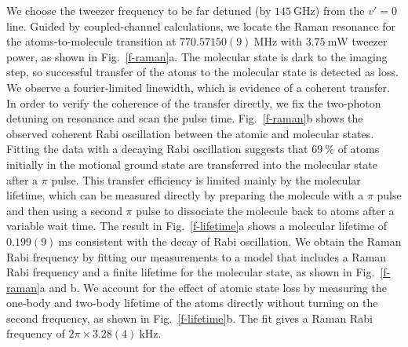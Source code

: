 \documentclass[aps,prl,twocolumn,10pt,superscriptaddress]{revtex4-1}
\begin{document}

We choose the tweezer frequency to be far detuned (by $145 ~\mathrm{GHz}$)
from the $v' = 0$ line. Guided by coupled-channel calculations,
we locate the Raman resonance for the atoms-to-molecule transition at
$770.57150(9) ~\mathrm{MHz}$ with $3.75~\mathrm{mW}$ tweezer power,
as shown in Fig.~\ref{f-raman}a.
The molecular state is dark to the imaging step,
so successful transfer of the atoms to the molecular state is detected as loss.
We observe a fourier-limited linewidth, which is evidence of a coherent transfer.
In order to verify the coherence of the transfer directly,
we fix the two-photon detuning on resonance and scan the pulse time.
Fig.~\ref{f-raman}b shows the observed coherent Rabi oscillation between the atomic and molecular states.
Fitting the data with a decaying Rabi oscillation suggests that
$69~\mathrm{\%}$ of atoms initially in the motional ground state are transferred into the molecular state after a $\pi$ pulse.
This transfer efficiency is limited mainly by the molecular lifetime,
which can be measured directly by preparing the molecule with a $\pi $ pulse
and then using a second $\pi$ pulse to dissociate the molecule back to atoms
after a variable wait time.
The result in Fig.~\ref{f-lifetime}a shows a molecular lifetime of $0.199(9)~\mathrm{ms}$
consistent with the decay of Rabi oscillation.
We obtain the Raman Rabi frequency by fitting our measurements to a model
that includes a Raman Rabi frequency and
a finite lifetime for the molecular state, as shown in Fig.~\ref{f-raman}a and b.
We account for the effect of atomic state loss by measuring the one-body and
two-body lifetime of the atoms directly without turning on the second frequency,
as shown in Fig.~\ref{f-lifetime}b.
The fit gives a Raman Rabi frequency of $2\pi\times3.28(4)~\mathrm{kHz}$.
\end{document}

